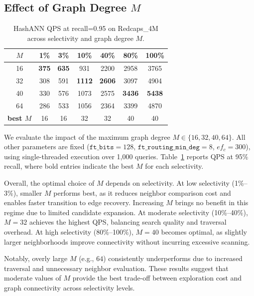 \subsection{Effect of Graph Degree $M$}

\begin{table}[t]
  \caption{HashANN QPS at recall=0.95 on Redcaps\_4M across selectivity and graph degree $M$.}
  \label{tab:m-ablation-redcaps}
  \begin{tabular}{c|cccccc}
    \hline
    \textbf{$M$} & \textbf{1\%} & \textbf{3\%} & \textbf{10\%} & \textbf{40\%} & \textbf{80\%} & \textbf{100\%} \\
    \hline
    16  & \textbf{375}  & \textbf{635}  & 931           & 2200          & 2958          & 3765 \\
    \hline
    32  & 308           & 591           & \textbf{1112} & \textbf{2606} & 3097          & 4904 \\
    \hline
    40  & 330           & 576           & 1073          & 2575          & \textbf{3436} & \textbf{5438} \\
    \hline
    64  & 286           & 533           & 1056          & 2364          & 3399          & 4870 \\
    \hline
    \textbf{best $M$} & 16 & 16 & 32 & 32 & 40 & 40 \\
    \hline
  \end{tabular}
\end{table}

We evaluate the impact of the maximum graph degree $M \in \{16, 32, 40, 64\}$. All other parameters are fixed ($\texttt{ft\_bits}=128$, $\texttt{ft\_routing\_min\_deg}=8$, $ef_c=300$), using single-threaded execution over 1,000 queries. Table~\ref{tab:m-ablation-redcaps} reports QPS at 95\% recall, where bold entries indicate the best $M$ for each selectivity.

Overall, the optimal choice of $M$ depends on selectivity. At low selectivity (1\%--3\%), smaller $M$ performs best, as it reduces neighbor comparison cost and enables faster transition to edge recovery. Increasing $M$ brings no benefit in this regime due to limited candidate expansion. At moderate selectivity (10\%--40\%), $M=32$ achieves the highest QPS, balancing search quality and traversal overhead. At high selectivity (80\%--100\%), $M=40$ becomes optimal, as slightly larger neighborhoods improve connectivity without incurring excessive scanning.

Notably, overly large $M$ (e.g., $64$) consistently underperforms due to increased traversal and unnecessary neighbor evaluation. These results suggest that moderate values of $M$ provide the best trade-off between exploration cost and graph connectivity across selectivity levels.

